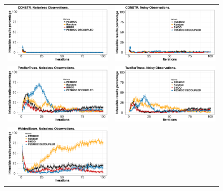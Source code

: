 \begin{figure}[htb]
        \begin{tabular}{cc}
                \vspace{-.2cm}
                \includegraphics[width=0.475\linewidth]{../Figures/pesmoc/benchmark/CONSTR_zeros_noiseless} &
                \includegraphics[width=0.475\linewidth]{../Figures/pesmoc/benchmark/CONSTR_zeros_noisy} \\
                \includegraphics[width=0.475\linewidth]{../Figures/pesmoc/benchmark/TwoBarTruss_zeros_noiseless} &
                \includegraphics[width=0.475\linewidth]{../Figures/pesmoc/benchmark/TwoBarTruss_zeros_noisy} \\
                \includegraphics[width=0.475\linewidth]{../Figures/pesmoc/benchmark/WeldedBeam_zeros_noiseless} &

\end{tabular}
\end{figure}
